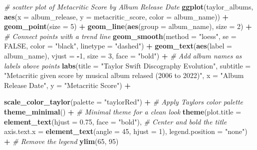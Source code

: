 \documentclass[
]{article}
\newenvironment{Shaded}{\begin{snugshade}}{\end{snugshade}}
\newcommand{\AttributeTok}[1]{\textcolor[rgb]{0.13,0.29,0.53}{#1}}
\newcommand{\CommentTok}[1]{\textcolor[rgb]{0.56,0.35,0.01}{\textit{#1}}}
\newcommand{\ConstantTok}[1]{\textcolor[rgb]{0.56,0.35,0.01}{#1}}
\newcommand{\DecValTok}[1]{\textcolor[rgb]{0.00,0.00,0.81}{#1}}
\newcommand{\FloatTok}[1]{\textcolor[rgb]{0.00,0.00,0.81}{#1}}
\newcommand{\FunctionTok}[1]{\textcolor[rgb]{0.13,0.29,0.53}{\textbf{#1}}}
\newcommand{\NormalTok}[1]{#1}
\newcommand{\SpecialCharTok}[1]{\textcolor[rgb]{0.81,0.36,0.00}{\textbf{#1}}}
\newcommand{\StringTok}[1]{\textcolor[rgb]{0.31,0.60,0.02}{#1}}
\begin{document}
\begin{Shaded}
\begin{Highlighting}[]
\CommentTok{\# scatter plot of Metacritic Score by Album Release Date}
\FunctionTok{ggplot}\NormalTok{(taylor\_albums, }\FunctionTok{aes}\NormalTok{(}\AttributeTok{x =}\NormalTok{ album\_release, }
                          \AttributeTok{y =}\NormalTok{ metacritic\_score, }
                          \AttributeTok{color =}\NormalTok{ album\_name)) }\SpecialCharTok{+} 
  \FunctionTok{geom\_point}\NormalTok{(}\AttributeTok{size =} \DecValTok{5}\NormalTok{) }\SpecialCharTok{+}  
  \FunctionTok{geom\_line}\NormalTok{(}\FunctionTok{aes}\NormalTok{(}\AttributeTok{group =}\NormalTok{ album\_name), }\AttributeTok{size =} \DecValTok{2}\NormalTok{) }\SpecialCharTok{+}  \CommentTok{\# Connect points with a trend line}
  \FunctionTok{geom\_smooth}\NormalTok{(}\AttributeTok{method =} \StringTok{"loess"}\NormalTok{, }\AttributeTok{se =} \ConstantTok{FALSE}\NormalTok{, }\AttributeTok{color =} \StringTok{"black"}\NormalTok{, }\AttributeTok{linetype =} \StringTok{"dashed"}\NormalTok{) }\SpecialCharTok{+}
  \FunctionTok{geom\_text}\NormalTok{(}\FunctionTok{aes}\NormalTok{(}\AttributeTok{label =}\NormalTok{ album\_name), }\AttributeTok{vjust =} \SpecialCharTok{{-}}\DecValTok{1}\NormalTok{, }\AttributeTok{size =} \DecValTok{3}\NormalTok{, }\AttributeTok{face =} \StringTok{"bold"}\NormalTok{) }\SpecialCharTok{+}  \CommentTok{\# Add album names as labels above points}
  \FunctionTok{labs}\NormalTok{(}\AttributeTok{title =} \StringTok{"Taylor Swift Discography Evolution"}\NormalTok{,}
       \AttributeTok{subtitle =}  \StringTok{"Metacritic given score by musical album relased (2006 to 2022)"}\NormalTok{,}
       \AttributeTok{x =} \StringTok{"Album Release Date"}\NormalTok{,}
       \AttributeTok{y =} \StringTok{"Metacritic Score"}\NormalTok{) }\SpecialCharTok{+}
  
  \FunctionTok{scale\_color\_taylor}\NormalTok{(}\AttributeTok{palette =} \StringTok{"taylorRed"}\NormalTok{) }\SpecialCharTok{+}  \CommentTok{\# Apply Taylor\textquotesingle{}s color palette}
  \FunctionTok{theme\_minimal}\NormalTok{() }\SpecialCharTok{+}  \CommentTok{\# Minimal theme for a clean look}
  \FunctionTok{theme}\NormalTok{(}\AttributeTok{plot.title =} \FunctionTok{element\_text}\NormalTok{(}\AttributeTok{hjust =} \FloatTok{0.75}\NormalTok{, }\AttributeTok{face =} \StringTok{"bold"}\NormalTok{),  }\CommentTok{\# Center and bold the title}
        \AttributeTok{axis.text.x =} \FunctionTok{element\_text}\NormalTok{(}\AttributeTok{angle =} \DecValTok{45}\NormalTok{, }\AttributeTok{hjust =} \DecValTok{1}\NormalTok{),}
        \AttributeTok{legend.position =} \StringTok{"none"}\NormalTok{) }\SpecialCharTok{+}  \CommentTok{\# Remove the legend }
         \FunctionTok{ylim}\NormalTok{(}\DecValTok{65}\NormalTok{, }\DecValTok{95}\NormalTok{) }
\end{Highlighting}
\end{Shaded}
\end{document}
